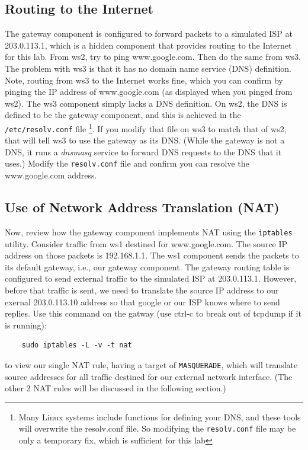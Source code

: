 \subsection{Routing to the Internet}
The gateway component is configured to forward packets to a simulated ISP at 203.0.113.1, which 
is a hidden component that provides routing to the Internet for this lab.  From ws2, 
try to ping www.google.com.  Then do the same from ws3.  The problem with ws3 is that
it has no domain name service (DNS) definition.  Note, routing from ws3 to the Internet
works fine, which you can confirm by pinging the IP address of www.google.com (as displayed
when you pinged from ws2).  The ws3 component simply lacks a DNS definition. 
On ws2, the DNS is defined to be the
gateway component, and this is achieved in the \texttt{/etc/resolv.conf} file \footnote{
Many Linux systems include functions for defining your DNS, and these tools will overwrite
the resolv.conf file.  So modifying the {\tt resolv.conf} file may be only a temporary
fix, which is sufficient for this lab}.  If you 
modify that file on ws3 to match that of ws2, that will tell ws3 to use the gateway
as its DNS.  (While the gateway is not a DNS, it runs a \textit{dnsmasq} service to forward DNS requests to
the DNS that it uses.)   Modify the {\tt resolv.conf} file and confirm you can resolve the www.google.com
address.

\subsection{Use of Network Address Translation (NAT)}
Now, review how the gateway component implements NAT using the \texttt{iptables} 
utility.  Consider traffic from ws1 destined for www.google.com. The source IP address
on those packets is 192.168.1.1.  The ws1 component sends the packets to its default
gateway, i.e., our gateway component.  The gateway routing table is configured to
send external traffic to the simulated ISP at 203.0.113.1.  However, before that traffic is sent, we need
to translate the source IP address to our exernal 203.0.113.10 address so that google or our ISP knows
where to send replies.  
Use this command on the gatway (use ctrl-c to break out of tcpdump if it is running):
\begin{verbatim}
    sudo iptables -L -v -t nat
\end{verbatim}
\noindent to view our single NAT rule, having a target of \texttt{MASQUERADE}, which will translate
source addresses for all traffic destined for our external network interface. (The other 2 NAT rules will
be discussed in the following section.) 

